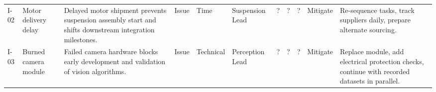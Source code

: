 \begin{longtable}{C{1.0cm} L{2.3cm} L{5.05cm} L{1.7cm} C{1.6cm} L{1.9cm} C{0.6cm} C{0.6cm} C{0.8cm} L{2.0cm} L{4.1cm}}
    I-02 & Motor delivery delay & Delayed motor shipment prevents suspension assembly start and shifts downstream integration milestones. & Issue & Time & Suspension Lead & ? & ? & ? & Mitigate & Re-sequence tasks, track suppliers daily, prepare alternate sourcing. \\
    I-03 & Burned camera module & Failed camera hardware blocks early development and validation of vision algorithms. & Issue & Technical & Perception Lead & ? & ? & ? & Mitigate & Replace module, add electrical protection checks, continue with recorded datasets in parallel. \\

\end{longtable}
\endgroup
